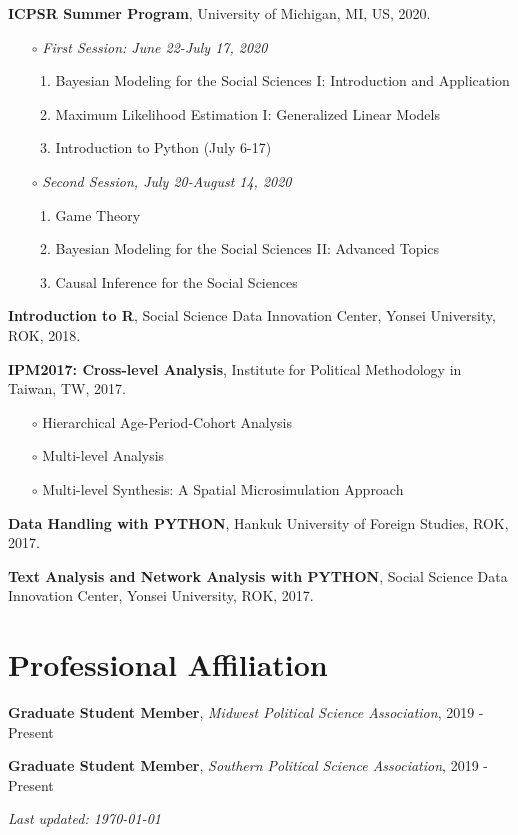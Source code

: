 \documentclass[margin,line]{res}
\begin{document}
\begin{resume}
{\bf ICPSR Summer Program}, University of Michigan, MI, US, 2020.

\begin{itemize} \itemsep -1mm 
	\item[$\circ$] \textit{First Session: June 22-July 17, 2020}
	\begin{enumerate} \itemsep -1mm 
		\item Bayesian Modeling for the Social Sciences I: Introduction and Application
		\item Maximum Likelihood Estimation I: Generalized Linear Models
		\item Introduction to Python (July 6-17)
	\end{enumerate}
	\item[$\circ$] \textit{Second Session, July 20-August 14, 2020}
	\begin{enumerate} \itemsep -1mm 
		\item Game Theory
		\item Bayesian Modeling for the Social Sciences II: Advanced Topics
		\item Causal Inference for the Social Sciences
	\end{enumerate}
\end{itemize}

\vspace{-.1cm}

{\bf Introduction to R}, Social Science Data Innovation Center, Yonsei University, ROK, 2018.

\vspace{-.1cm}

{\bf IPM2017: Cross-level Analysis}, Institute for Political Methodology in Taiwan, TW, 2017.

\begin{itemize} \itemsep -1mm 
	\item[$\circ$] Hierarchical Age-Period-Cohort Analysis
	\item[$\circ$] Multi-level Analysis
	\item[$\circ$] Multi-level Synthesis: A Spatial Microsimulation Approach
\end{itemize}

{\bf Data Handling with PYTHON}, Hankuk University of Foreign Studies, ROK, 2017.

\vspace{-.1cm}

{\bf Text Analysis and Network Analysis with PYTHON}, Social Science Data Innovation Center, Yonsei University, ROK, 2017.

\section{\sc Professional Affiliation}

{\bf Graduate Student Member}, {\it Midwest Political Science Association}, 2019 - Present

{\bf Graduate Student Member}, {\it Southern Political Science Association}, 2019 - Present

\mbox{}
\vfill
\centering \textit{Last updated: \today}


\end{resume}
\end{document}
